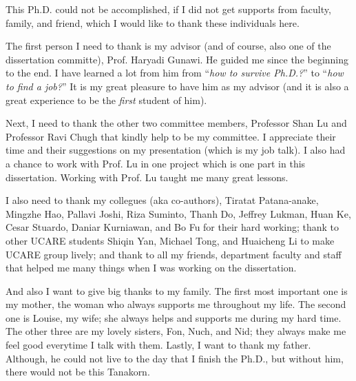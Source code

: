 This Ph.D. could not be accomplished, if I did not get supports from faculty,
family, and friend, which I would like to thank these individuals here.

The first person I need to thank is my advisor (and of course, also one of the
dissertation committe), Prof. Haryadi Gunawi. He guided me since the beginning
to the end. I have learned a lot from him from ``\textit{how to survive
Ph.D.?}'' to ``\textit{how to find a job?}'' It is my great pleasure to have him
as my advisor (and it is also a great experience to be the \textit{first}
student of him).

Next, I need to thank the other two committee members, Professor Shan Lu and
Professor Ravi Chugh that kindly help to be my committee. I appreciate their
time and their suggestions on my presentation (which is my job talk). I also had
a chance to work with Prof. Lu in one project which is one part in this
dissertation.  Working with Prof. Lu taught me many great lessons.

I also need to thank my collegues (aka co-authors), Tiratat Patana-anake,
Mingzhe Hao, Pallavi Joshi, Riza Suminto, Thanh Do, Jeffrey Lukman, Huan Ke,
Cesar Stuardo, Daniar Kurniawan, and Bo Fu for their hard working; thank to
other UCARE students Shiqin Yan, Michael Tong, and Huaicheng Li to make UCARE
group lively; and thank to all my friends, department faculty and staff that
helped me many things when I was working on the dissertation.

And also I want to give big thanks to my family. The first most important one is
my mother, the woman who always supports me throughout my life. The second one
is Louise, my wife; she always helps and supports me during my hard time. The
other three are my lovely sisters, Fon, Nuch, and Nid; they always make me feel
good everytime I talk with them. Lastly, I want to thank my father. Although,
he could not live to the day that I finish the Ph.D., but without him, there
would not be this Tanakorn.

